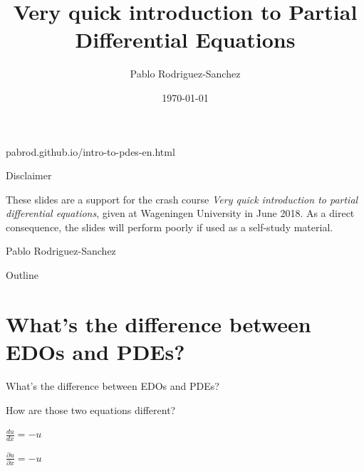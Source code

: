 \documentclass{beamer}
\title{Very quick introduction to Partial Differential Equations}
\author{Pablo Rodriguez-Sanchez}
\institute{Wageningen University and Research}
\date{\today}
\begin{document}
\begin{frame}
  \titlepage
  
  \begin{center}
  \end{center}
  
  \begin{center}
  pabrod.github.io/intro-to-pdes-en.html
  \end{center}
  
\end{frame}

\begin{frame}{Disclaimer}

These slides are a support for the crash course \textit{Very quick introduction to partial differential equations}, given at Wageningen University in June 2018. As a direct consequence, the slides will perform poorly if used as a self-study material.

\begin{flushright}
Pablo Rodriguez-Sanchez
\end{flushright}

\end{frame}

\begin{frame}{Outline}
 \tableofcontents
\end{frame}

\section{What's the difference between EDOs and PDEs?}

  \begin{frame}{What's the difference between EDOs and PDEs?}

    How are those two equations different?

    \begin{center}
    $\frac{du}{dx} = -u$
    \end{center}

    \begin{center}
    $\frac{\partial u}{\partial x} = -u$
    \end{center}

  \end{frame}
\end{document}
